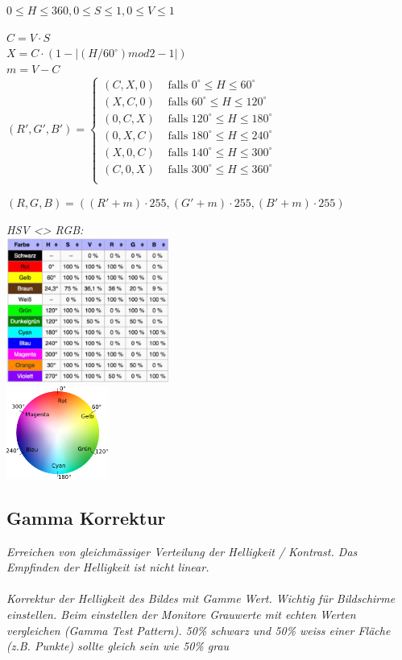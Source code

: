 \textit{$0 \leq H \leq 360, 0 \leq S \leq 1, 0 \leq V \leq 1$}

$C = V \cdot S$\\
$X = C \cdot (1 - |(H / 60^\circ) mod 2-1|)$\\
$m = V - C$\\

$(R',G',B') = \begin{cases}
	(C,X,0)	& \text{ falls } 0^\circ \leq H \leq 60^\circ \\
	(X,C,0)	& \text{ falls } 60^\circ \leq H \leq 120^\circ \\
	(0,C,X)	& \text{ falls } 120^\circ \leq H \leq 180^\circ \\
	(0,X,C)	& \text{ falls } 180^\circ \leq H \leq 240^\circ \\
	(X,0,C)	& \text{ falls } 140^\circ \leq H \leq 300^\circ \\
	(C,0,X)	& \text{ falls } 300^\circ \leq H \leq 360^\circ \\
\end{cases}$

$(R,G,B) = ((R'+m)\cdot255, (G'+m)\cdot255, (B'+m)\cdot255)$

\textit{HSV <> RGB: }\\
\includegraphics[width=0.4\textwidth]{assets/hsv-rgb.png}
\\
\includegraphics[width=0.25\textwidth]{assets/hsv_hue.png}

\subsection{Gamma Korrektur}

\textit{
    Erreichen von gleichmässiger Verteilung der Helligkeit / Kontrast.
    Das Empfinden der Helligkeit ist nicht linear.
} \\
\\
\textit{
    Korrektur der Helligkeit des Bildes mit Gamme Wert. Wichtig für Bildschirme einstellen.
    Beim einstellen der Monitore Grauwerte mit echten Werten vergleichen (Gamma Test Pattern).
    50\% schwarz und 50\% weiss einer Fläche (z.B. Punkte) sollte gleich sein wie 50\% grau
}

